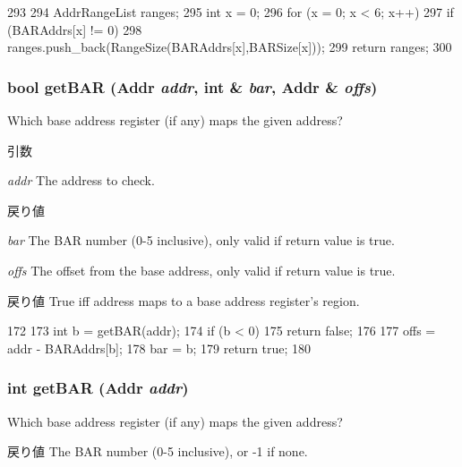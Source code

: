 \begin{DoxyCode}
293 {
294     AddrRangeList ranges;
295     int x = 0;
296     for (x = 0; x < 6; x++)
297         if (BARAddrs[x] != 0)
298             ranges.push_back(RangeSize(BARAddrs[x],BARSize[x]));
299     return ranges;
300 }
\end{DoxyCode}
\hypertarget{classPciDevice_a0678ae6a6ecde363fbe15ab17ebce109}{
\subsubsection[{getBAR}]{\setlength{\rightskip}{0pt plus 5cm}bool getBAR ({\bf Addr} {\em addr}, \/  int \& {\em bar}, \/  {\bf Addr} \& {\em offs})}}
\label{classPciDevice_a0678ae6a6ecde363fbe15ab17ebce109}
Which base address register (if any) maps the given address? 
\begin{DoxyParams}{引数}
\item[{\em addr}]The address to check. \end{DoxyParams}

\begin{DoxyRetVals}{戻り値}
\item[{\em bar}]The BAR number (0-\/5 inclusive), only valid if return value is true. \item[{\em offs}]The offset from the base address, only valid if return value is true. \end{DoxyRetVals}
\begin{DoxyReturn}{戻り値}
True iff address maps to a base address register's region. 
\end{DoxyReturn}



\begin{DoxyCode}
172     {
173         int b = getBAR(addr);
174         if (b < 0)
175             return false;
176 
177         offs = addr - BARAddrs[b];
178         bar = b;
179         return true;
180     }
\end{DoxyCode}
\hypertarget{classPciDevice_ad7fbff3ce8627dac12313ed7ac1ea44a}{
\subsubsection[{getBAR}]{\setlength{\rightskip}{0pt plus 5cm}int getBAR ({\bf Addr} {\em addr})}}
\label{classPciDevice_ad7fbff3ce8627dac12313ed7ac1ea44a}
Which base address register (if any) maps the given address? \begin{DoxyReturn}{戻り値}
The BAR number (0-\/5 inclusive), or -\/1 if none. 
\end{DoxyReturn}



